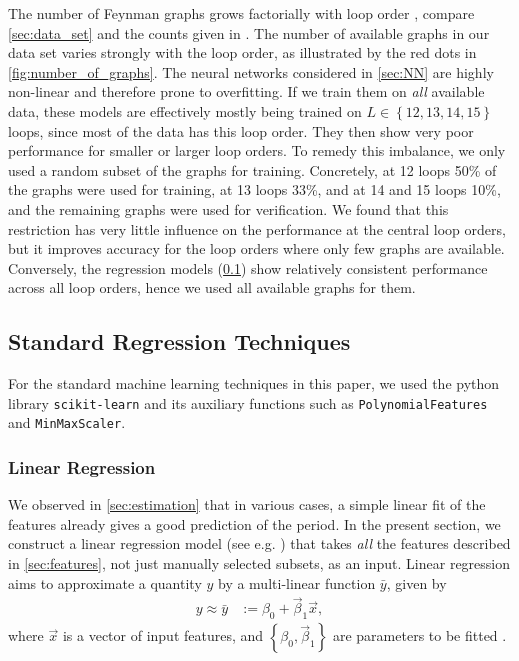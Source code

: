 \documentclass[11pt]{scrartcl}
\numberwithin{equation}{section}
\begin{document}
The number of Feynman graphs grows factorially with loop order \cite{cvitanovic_number_1978,borinsky_renormalized_2017}, compare \cref{sec:data_set} and the counts given in \cite{balduf_statistics_2023}.   The number of available graphs in our data set varies strongly with the loop order, as illustrated by the red dots in \cref{fig:number_of_graphs}. The neural networks considered in \cref{sec:NN} are highly non-linear and therefore prone to overfitting. 
If we train them on \emph{all} available data, these models are effectively mostly being trained on $L\in \left \lbrace 12, 13,14,15 \right \rbrace $ loops, since most of the data has this loop order. They then show very poor performance for smaller or larger loop orders. To remedy this imbalance, we only used a random subset of the graphs for training. Concretely, at 12 loops 50\% of the graphs were used for training, at 13 loops 33\%, and at 14 and 15 loops 10\%, and the remaining graphs were used for verification. We found that this restriction has very little influence on the performance at the central loop orders, but it improves accuracy for the loop orders where only few graphs are available.  Conversely, the regression models   (\cref{sec:standard_machine_learning}) show relatively consistent performance across all loop orders, hence we used all available graphs for them. 





\subsection{Standard Regression Techniques}\label{sec:standard_machine_learning}

For the standard machine learning techniques in this paper, we used the python library  \texttt{scikit-learn}  \cite{pedregosa_scikitlearn_2012} and its auxiliary functions such as \texttt{PolynomialFeatures} and \texttt{MinMaxScaler}.  

\subsubsection{Linear Regression}\label{sec:linear_regression}
We observed in \cref{sec:estimation} that in various cases, a simple linear fit of the features already gives a good prediction of the period. In the present section, we construct a  linear regression model (see e.g. \cite{maulud_review_2020}) that takes \emph{all} the features described in \cref{sec:features}, not just manually selected subsets, as an input.
Linear regression aims to approximate a quantity $y$  by a multi-linear function $\bar y$, given by
\begin{align}\label{def:linear_regression}
y  \approx \bar y  &:= \beta_0 + \vec \beta_1 \vec x, 
\end{align}
where   $\vec x$ is a vector of input features, and $\left \lbrace \beta_0, \vec \beta_1 \right \rbrace $ are parameters to be fitted .
\end{document}
